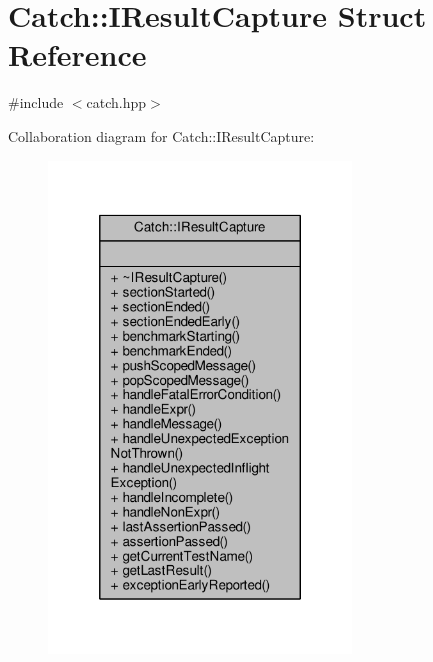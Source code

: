 \hypertarget{struct_catch_1_1_i_result_capture}{\section{Catch\-:\-:I\-Result\-Capture Struct Reference}
\label{struct_catch_1_1_i_result_capture}
}


{\ttfamily \#include $<$catch.\-hpp$>$}



Collaboration diagram for Catch\-:\-:I\-Result\-Capture\-:
\nopagebreak
\begin{figure}[H]
\begin{center}
\leavevmode
\includegraphics[width=228pt]{struct_catch_1_1_i_result_capture__coll__graph}
\end{center}
\end{figure}
